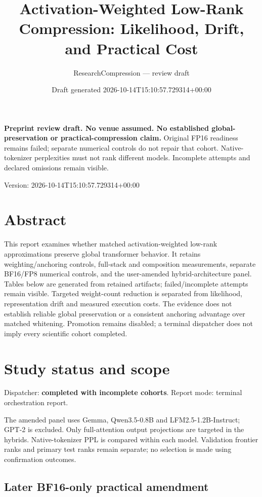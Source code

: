 \documentclass[10pt]{article}
\title{Activation-Weighted Low-Rank Compression: Likelihood, Drift, and Practical Cost}
\author{ResearchCompression --- review draft}
\date{Draft generated 2026-10-14T15:10:57.729314+00:00}
\begin{document}
\maketitle
\noindent\textbf{Preprint review draft. No venue assumed. No established global-preservation or practical-compression claim.}
Original FP16 readiness remains failed; separate numerical controls do not repair that cohort. Native-tokenizer perplexities must not rank different models. Incomplete attempts and declared omissions remain visible.


Version: 2026-10-14T15:10:57.729314+00:00

\section{Abstract}

This report examines whether matched activation-weighted low-rank approximations preserve global transformer behavior. It retains weighting/anchoring controls, full-stack and composition measurements, separate BF16/FP8 numerical controls, and the user-amended hybrid-architecture panel. Tables below are generated from retained artifacts; failed/incomplete attempts remain visible. Targeted weight-count reduction is separated from likelihood, representation drift and measured execution costs. The evidence does not establish reliable global preservation or a consistent anchoring advantage over matched whitening. Promotion remains disabled; a terminal dispatcher does not imply every scientific cohort completed.

\section{Study status and scope}

Dispatcher: \textbf{completed with incomplete cohorts}. Report mode: terminal orchestration report.

The amended panel uses Gemma, Qwen3.5-0.8B and LFM2.5-1.2B-Instruct; GPT-2 is excluded. Only full-attention output projections are targeted in the hybrids. Native-tokenizer PPL is compared within each model. Validation frontier ranks and primary test ranks remain separate; no selection is made using confirmation outcomes.

\subsection{Later BF16-only practical amendment}
\end{document}
